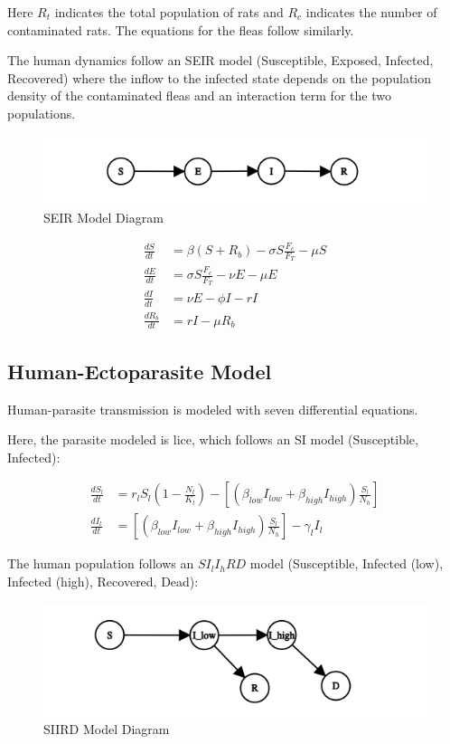 \documentclass [letterpaper, 12pt] {article}
\begin{document}
Here $R_t$ indicates the total population of rats and $R_c$ indicates the number of contaminated rats. The equations for the fleas follow similarly.

The human dynamics follow an SEIR model (Susceptible, Exposed, Infected, Recovered) where the inflow to the infected state depends on the
population density of the contaminated fleas and an interaction term for the two populations.

\begin{figure}[H]
	\centering
	\includegraphics[width=0.75\linewidth]{seir-graph.png}
	\caption{SEIR Model Diagram}
\end{figure}

\begin{align}
	\frac{dS}{dt} &= \beta (S+R_b) - \sigma S \frac{F_c}{F_T} - \mu S \\
	\frac{dE}{dt} &= \sigma S \frac{F_c}{F_T} - \nu E - \mu E \\
	\frac{dI}{dt} &= \nu E - \phi I - rI \\
	\frac{dR_b}{dt} &= rI - \mu R_b
\end{align}



\subsection {Human-Ectoparasite Model}
Human-parasite transmission is modeled with seven differential equations.

Here, the parasite modeled is lice, which follows an SI model (Susceptible, Infected):

\begin{align}
	\frac{dS_l}{dt} &= r_l S_l \left( 1 - \frac{N_l}{K_l} \right) - \left[ \left( \beta_{low} I_{low} + \beta_{high} I_{high} \right) \frac{S_l}{N_h} \right] \\
	\frac{dI_l}{dt} &= \left[ \left( \beta_{low} I_{low} + \beta_{high} I_{high} \right) \frac{S_l}{N_h} \right] - \gamma_l I_l
\end{align}

The human population follows an $S I_l I_h R D$ model (Susceptible, Infected (low), Infected (high), Recovered, Dead):

\begin{figure}[H]
	\centering
	\includegraphics[width=0.75\linewidth]{siird-graph.png}
	\caption{SIIRD Model Diagram}
\end{figure}
\end{document}

